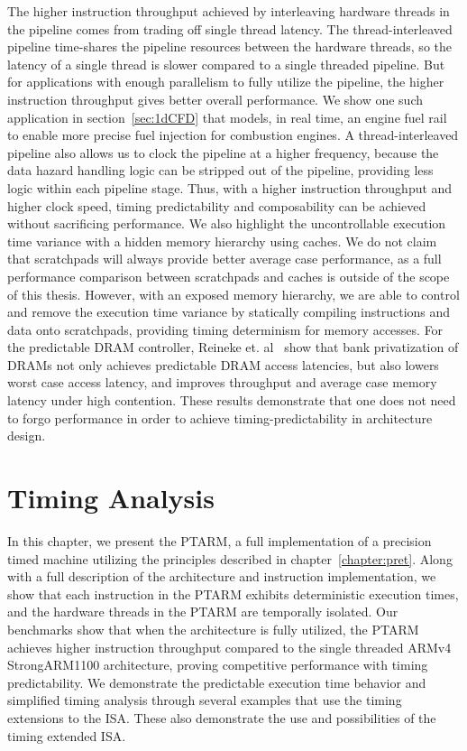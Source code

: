 The higher instruction throughput achieved by interleaving hardware threads in the pipeline comes from trading off single thread latency.   
The thread-interleaved pipeline time-shares the pipeline resources between the hardware threads, so the latency of a single thread is slower compared to a single threaded pipeline. 
But for applications with enough parallelism to fully utilize the pipeline, the higher instruction throughput gives better overall performance.
We show one such application in section~\ref{sec:1dCFD} that models, in real time, an engine fuel rail to enable more precise fuel injection for combustion engines.     
A thread-interleaved pipeline also allows us to clock the pipeline at a higher frequency, because the data hazard handling logic can be stripped out of the pipeline, providing less logic within each pipeline stage.
Thus, with a higher instruction throughput and higher clock speed, timing predictability and composability can be achieved without sacrificing performance.
We also highlight the uncontrollable execution time variance with a hidden memory hierarchy using caches.
We do not claim that scratchpads will always provide better average case performance, as a full performance comparison between scratchpads and caches is outside of the scope of this thesis. 
However, with an exposed memory hierarchy, we are able to control and remove the execution time variance by statically compiling instructions and data onto scratchpads, providing timing determinism for memory accesses.
For the predictable DRAM controller, Reineke et. al~\cite{ReinekeLiuPatelKimLee11_PRETDRAMControllerBankPrivatizationForPredictability} show that bank privatization of DRAMs not only achieves predictable DRAM access latencies, but also lowers worst case access latency, and improves throughput and average case memory latency under high contention. 
These results demonstrate that one does not need to forgo performance in order to achieve timing-predictability in architecture design.

\section{Timing Analysis}
\label{sec:wcet}


\bigskip

In this chapter, we present the PTARM, a full implementation of a precision timed machine utilizing the principles described in chapter~\ref{chapter:pret}. 
Along with a full description of the architecture and instruction implementation, we show that each instruction in the PTARM exhibits deterministic execution times, and the hardware threads in the PTARM are temporally isolated.
Our benchmarks show that when the architecture is fully utilized, the PTARM achieves higher instruction throughput compared to the single threaded ARMv4 StrongARM1100 architecture, proving competitive performance with timing predictability.
We demonstrate the predictable execution time behavior and simplified timing analysis through several examples that use the timing extensions to the ISA.
These also demonstrate the use and possibilities of the timing extended ISA. 
   
 

